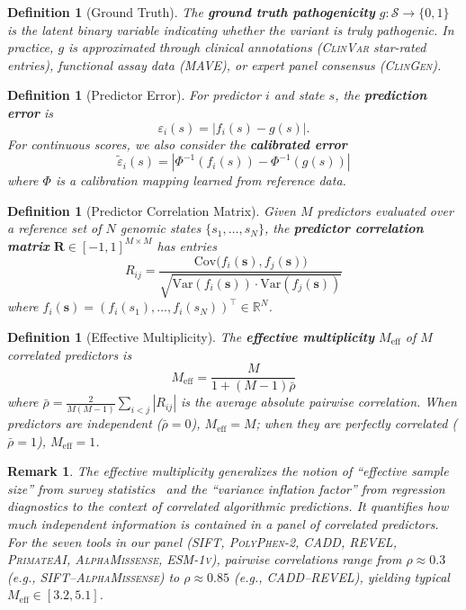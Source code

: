 \documentclass[11pt,a4paper]{article}
\newtheorem{definition}[theorem]{Definition}
\newtheorem{remark}[theorem]{Remark}
\theoremstyle{definition}
\newcommand{\R}{\mathbb{R}}
\newcommand{\Var}{\mathrm{Var}}
\newcommand{\Cov}{\mathrm{Cov}}
\newcommand{\calS}{\mathcal{S}}
\newcommand{\ClinVar}{\textsc{ClinVar}}
\newcommand{\MAVE}{\textsc{MAVE}}
\newcommand{\SIFT}{\textsc{SIFT}}
\newcommand{\PolyPhen}{\textsc{PolyPhen-2}}
\newcommand{\CADD}{\textsc{CADD}}
\newcommand{\REVEL}{\textsc{REVEL}}
\newcommand{\PrimateAI}{\textsc{PrimateAI}}
\newcommand{\AlphaMissense}{\textsc{AlphaMissense}}
\newcommand{\ESM}{\textsc{ESM-1v}}
\begin{document}
\begin{definition}[Ground Truth]
\label{def:ground-truth}
The \textbf{ground truth pathogenicity} $g: \calS \to \{0,1\}$ is the latent binary variable indicating whether the variant is truly pathogenic.
In practice, $g$ is approximated through clinical annotations (\ClinVar{} star-rated entries), functional assay data (\MAVE), or expert panel consensus (\textsc{ClinGen}).
\end{definition}
\begin{definition}[Predictor Error]
\label{def:error}
For predictor $i$ and state $s$, the \textbf{prediction error} is
\begin{equation}
    \varepsilon_i(s) = |f_i(s) - g(s)|.
\end{equation}
For continuous scores, we also consider the \textbf{calibrated error}
\begin{equation}
    \tilde{\varepsilon}_i(s) = |\Phi^{-1}(f_i(s)) - \Phi^{-1}(g(s))|
\end{equation}
where $\Phi$ is a calibration mapping learned from reference data.
\end{definition}
\begin{definition}[Predictor Correlation Matrix]
\label{def:correlation}
Given $M$ predictors evaluated over a reference set of $N$ genomic states $\{s_1, \dots, s_N\}$, the \textbf{predictor correlation matrix} $\mathbf{R} \in [-1,1]^{M \times M}$ has entries
\begin{equation}
    R_{ij} = \frac{\Cov\big(f_i(\mathbf{s}), f_j(\mathbf{s})\big)}{\sqrt{\Var(f_i(\mathbf{s})) \cdot \Var(f_j(\mathbf{s}))}}
\end{equation}
where $f_i(\mathbf{s}) = (f_i(s_1), \dots, f_i(s_N))^\top \in \R^N$.
\end{definition}
\begin{definition}[Effective Multiplicity]
\label{def:meff}
The \textbf{effective multiplicity} $M_{\text{eff}}$ of $M$ correlated predictors is
\begin{equation}
    M_{\text{eff}} = \frac{M}{1 + (M-1)\bar{\rho}}
\end{equation}
where $\bar{\rho} = \frac{2}{M(M-1)}\sum_{i<j} |R_{ij}|$ is the average absolute pairwise correlation.
When predictors are independent ($\bar{\rho}=0$), $M_{\text{eff}}=M$; when they are perfectly correlated ($\bar{\rho}=1$), $M_{\text{eff}}=1$.
\end{definition}
\begin{remark}
The effective multiplicity generalizes the notion of ``effective sample size'' from survey statistics~\cite{kish1965survey} and the ``variance inflation factor'' from regression diagnostics to the context of correlated algorithmic predictions.
It quantifies how much independent information is contained in a panel of correlated predictors.
For the seven tools in our panel (\SIFT, \PolyPhen, \CADD, \REVEL, \PrimateAI, \AlphaMissense, \ESM), pairwise correlations range from $\rho \approx 0.3$ (e.g., \SIFT--\AlphaMissense) to $\rho \approx 0.85$ (e.g., \CADD--\REVEL), yielding typical $M_{\text{eff}} \in [3.2, 5.1]$.
\end{remark}
\end{document}
